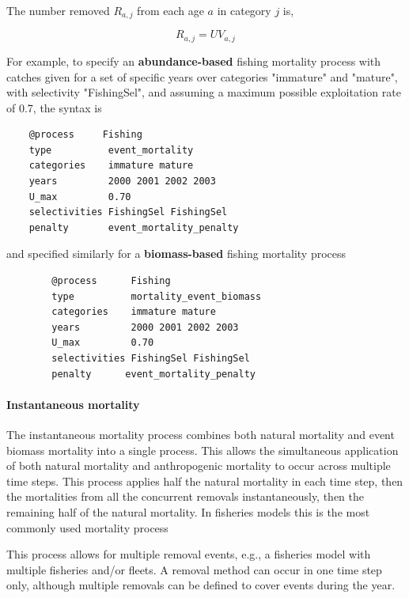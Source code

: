 The number removed $R_{a,j}$ from each age $a$ in category $j$ is,

\begin{equation}
  R_{a,j} = U V_{a,j}
\end{equation}

For example, to specify an \textbf{abundance-based} fishing mortality process with catches given for a set of specific years over categories "immature" and "mature", with selectivity "FishingSel", and assuming a maximum possible exploitation rate of 0.7, the syntax is

{\small{\begin{verbatim}
	@process     Fishing
	type          event_mortality
	categories    immature mature
	years         2000 2001 2002 2003
	U_max         0.70
	selectivities FishingSel FishingSel
	penalty       event_mortality_penalty
	\end{verbatim}}}

and specified similarly for a \textbf{biomass-based} fishing mortality process

{\small{\begin{verbatim}
		@process      Fishing
		type          mortality_event_biomass
		categories    immature mature
		years         2000 2001 2002 2003
		U_max         0.70
		selectivities FishingSel FishingSel
		penalty      event_mortality_penalty
		\end{verbatim}}}

\paragraph{Instantaneous mortality}\label{sec:Process-MortalityInstantaneous}\label{sec:Process-MortalityInstantaneousEventBiomass}\label{sec:Process-MortalityInstantaneousEvent}

The instantaneous mortality process combines both natural mortality and event biomass mortality into a single process. This allows the simultaneous application of both natural mortality and anthropogenic mortality to occur across multiple time steps. This process applies half the natural mortality in each time step, then the mortalities from all the concurrent removals instantaneously, then the remaining half of the natural mortality. In fisheries models this is the most commonly used mortality process

This process allows for multiple removal events, e.g., a fisheries model with multiple fisheries and/or fleets. A removal method can occur in one time step only, although multiple removals can be defined to cover events during the year.

